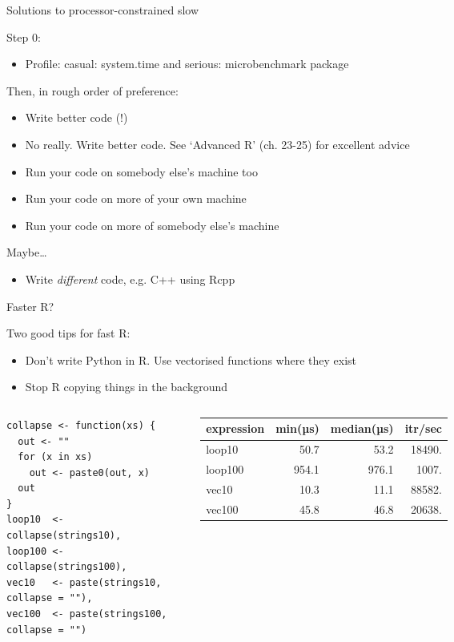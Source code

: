 \documentclass{hertieteaching}
\begin{document}
\begin{frame}[fragile]{Solutions to processor-constrained slow}

Step 0:
\begin{itemize}
  \item Profile: casual: \textsf{system.time} and serious: \textsf{microbenchmark} package
\end{itemize}

Then, in rough order of preference:
\begin{itemize}
\item Write better code (!)
\item No really. Write better code. See `Advanced R' (ch. 23-25) for excellent advice
\item
  Run your code on somebody else's machine too
\item
  Run your code on more of your own machine
\item
  Run your code on more of somebody else's machine
\end{itemize}

Maybe\ldots
\begin{itemize}
  \item Write \textit{different} code, e.g. \textsf{C++} using \textsf{Rcpp}
\end{itemize}
\end{frame}
\begin{frame}[fragile]{Faster R?}

Two good tips for fast R:
\begin{itemize}
  \item Don't write Python in R. Use vectorised functions where they exist
  \item Stop R copying things in the background
\end{itemize}

\begin{columns}[T,onlytextwidth]
\small
\begin{verbatim}
collapse <- function(xs) {
  out <- ""
  for (x in xs) 
    out <- paste0(out, x)
  out
}
loop10  <- collapse(strings10),
loop100 <- collapse(strings100),
vec10   <- paste(strings10, collapse = ""),
vec100  <- paste(strings100, collapse = "")
\end{verbatim}
\normalsize

\bigskip
\begin{tabular}{lrrr} \toprule
   expression &     min(µs)  & median(µs) & itr/sec\\ \midrule
   loop10     &  50.7  & 53.2  &  18490. \\
   loop100    & 954.1  &976.1  &   1007. \\
   vec10      &  10.3  & 11.1  &  88582. \\
   vec100     &  45.8  & 46.8  &  20638. \\ \bottomrule
\end{tabular}

\end{columns}



  
\end{frame}
\end{document}
